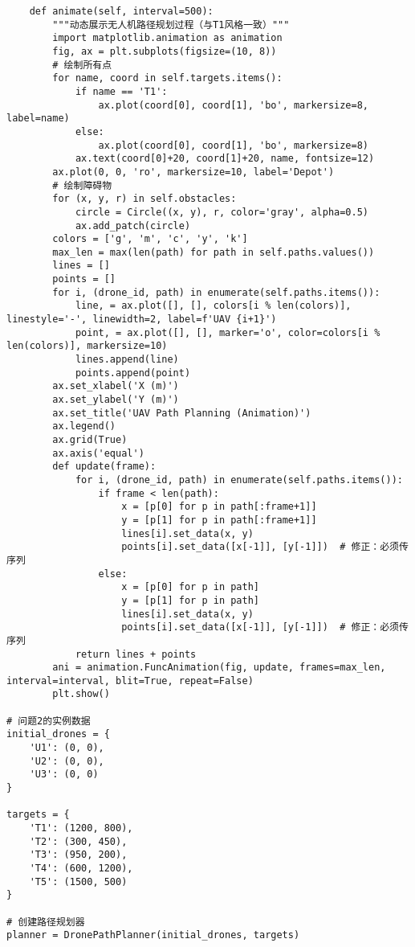 \documentclass[12pt,fontset=adobe]{ctexart}
\begin{document}
\begin{verbatim}
    def animate(self, interval=500):
        """动态展示无人机路径规划过程（与T1风格一致）"""
        import matplotlib.animation as animation
        fig, ax = plt.subplots(figsize=(10, 8))
        # 绘制所有点
        for name, coord in self.targets.items():
            if name == 'T1':
                ax.plot(coord[0], coord[1], 'bo', markersize=8, label=name)
            else:
                ax.plot(coord[0], coord[1], 'bo', markersize=8)
            ax.text(coord[0]+20, coord[1]+20, name, fontsize=12)
        ax.plot(0, 0, 'ro', markersize=10, label='Depot')
        # 绘制障碍物
        for (x, y, r) in self.obstacles:
            circle = Circle((x, y), r, color='gray', alpha=0.5)
            ax.add_patch(circle)
        colors = ['g', 'm', 'c', 'y', 'k']
        max_len = max(len(path) for path in self.paths.values())
        lines = []
        points = []
        for i, (drone_id, path) in enumerate(self.paths.items()):
            line, = ax.plot([], [], colors[i % len(colors)], linestyle='-', linewidth=2, label=f'UAV {i+1}')
            point, = ax.plot([], [], marker='o', color=colors[i % len(colors)], markersize=10)
            lines.append(line)
            points.append(point)
        ax.set_xlabel('X (m)')
        ax.set_ylabel('Y (m)')
        ax.set_title('UAV Path Planning (Animation)')
        ax.legend()
        ax.grid(True)
        ax.axis('equal')
        def update(frame):
            for i, (drone_id, path) in enumerate(self.paths.items()):
                if frame < len(path):
                    x = [p[0] for p in path[:frame+1]]
                    y = [p[1] for p in path[:frame+1]]
                    lines[i].set_data(x, y)
                    points[i].set_data([x[-1]], [y[-1]])  # 修正：必须传序列
                else:
                    x = [p[0] for p in path]
                    y = [p[1] for p in path]
                    lines[i].set_data(x, y)
                    points[i].set_data([x[-1]], [y[-1]])  # 修正：必须传序列
            return lines + points
        ani = animation.FuncAnimation(fig, update, frames=max_len, interval=interval, blit=True, repeat=False)
        plt.show()

# 问题2的实例数据
initial_drones = {
    'U1': (0, 0),
    'U2': (0, 0),
    'U3': (0, 0)
}

targets = {
    'T1': (1200, 800),
    'T2': (300, 450),
    'T3': (950, 200),
    'T4': (600, 1200),
    'T5': (1500, 500)
}

# 创建路径规划器
planner = DronePathPlanner(initial_drones, targets)


\end{verbatim}
\end{document}
